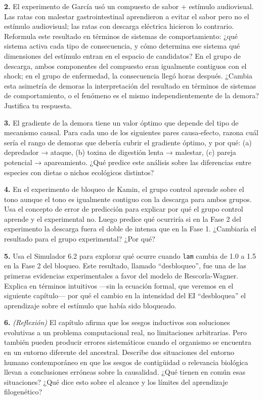 \documentclass[
  letterpaper,
  DIV=11,
  numbers=noendperiod]{scrreprt}
\begin{document}
\begin{tcolorbox}[enhanced jigsaw, arc=.35mm, bottomrule=.15mm, breakable, colback=white, colframe=quarto-callout-note-color-frame, left=2mm, leftrule=.75mm, opacityback=0, rightrule=.15mm, toprule=.15mm]
\textbf{2.} El experimento de García usó un compuesto de sabor +
estímulo audiovisual. Las ratas con malestar gastrointestinal
aprendieron a evitar el sabor pero no el estímulo audiovisual; las ratas
con descarga eléctrica hicieron lo contrario. Reformula este resultado
en términos de sistemas de comportamiento: ¿qué sistema activa cada tipo
de consecuencia, y cómo determina ese sistema qué dimensiones del
estímulo entran en el espacio de candidatos? En el grupo de descarga,
ambos componentes del compuesto eran igualmente contiguos con el shock;
en el grupo de enfermedad, la consecuencia llegó horas después. ¿Cambia
esta asimetría de demoras la interpretación del resultado en términos de
sistemas de comportamiento, o el fenómeno es el mismo independientemente
de la demora? Justifica tu respuesta.

\textbf{3.} El gradiente de la demora tiene un valor óptimo que depende
del tipo de mecanismo causal. Para cada uno de los siguientes pares
causa-efecto, razona cuál sería el rango de demoras que debería cubrir
el gradiente óptimo, y por qué: (a) depredador → ataque, (b) toxina de
digestión lenta → malestar, (c) pareja potencial → apareamiento. ¿Qué
predice este análisis sobre las diferencias entre especies con dietas o
nichos ecológicos distintos?

\textbf{4.} En el experimento de bloqueo de Kamin, el grupo control
aprende sobre el tono aunque el tono es igualmente contiguo con la
descarga para ambos grupos. Usa el concepto de error de predicción para
explicar por qué el grupo control aprende y el experimental no. Luego
predice qué ocurriría si en la Fase 2 del experimento la descarga fuera
el doble de intensa que en la Fase 1. ¿Cambiaría el resultado para el
grupo experimental? ¿Por qué?

\textbf{5.} Usa el Simulador 6.2 para explorar qué ocurre cuando
\texttt{lam} cambia de 1.0 a 1.5 en la Fase 2 del bloqueo. Este
resultado, llamado ``desbloqueo'', fue una de las primeras evidencias
experimentales a favor del modelo de Rescorla-Wagner. Explica en
términos intuitivos ---sin la ecuación formal, que veremos en el
siguiente capítulo--- por qué el cambio en la intensidad del EI
``desbloquea'' el aprendizaje sobre el estímulo que había sido
bloqueado.

\textbf{6.} \emph{(Reflexión)} El capítulo afirma que los sesgos
inductivos son soluciones evolutivas a un problema computacional real,
no limitaciones arbitrarias. Pero también pueden producir errores
sistemáticos cuando el organismo se encuentra en un entorno diferente
del ancestral. Describe dos situaciones del entorno humano contemporáneo
en que los sesgos de contigüidad o relevancia biológica llevan a
conclusiones erróneas sobre la causalidad. ¿Qué tienen en común esas
situaciones? ¿Qué dice esto sobre el alcance y los límites del
aprendizaje filogenético?


\end{tcolorbox}
\end{document}
